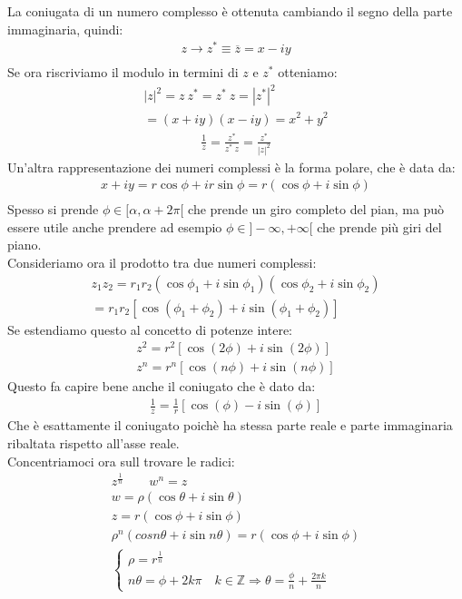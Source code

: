 \documentclass[a4paper, oneside]{article}
\begin{document}
    La coniugata di un numero complesso è ottenuta cambiando il segno della parte immaginaria, quindi:
    \begin{gather*}
        z \to z^* \equiv \overline{z} = x - iy\\
    \end{gather*}
    Se ora riscriviamo il modulo in termini di $z$ e $z^*$ otteniamo:
    \begin{gather*}
        |z|^2 = z \ z^* = z^* \ z = |z^*|^2\\
        = (x + iy)(x - iy) = x^2 + y^2
    \end{gather*}
    \begin{gather*}
        \frac{1}{z} = \frac{z^*}{z^* \ z} = \frac{z^*}{|z|^2}
    \end{gather*}
    Un'altra rappresentazione dei numeri complessi è la forma polare, che è data da:
    \begin{gather*}
        x + i y = r \cos \phi + i r \sin \phi = r (\cos \phi + i \sin \phi)\\
    \end{gather*}
    Spesso si prende $\phi \in [\alpha, \alpha+ 2\pi[$ che prende un giro completo del pian, ma può essere utile anche prendere ad esempio $\phi \in ]-\infty, +\infty[$ che prende più giri del piano.\\
    Consideriamo ora il prodotto tra due numeri complessi:
    \begin{gather*}
        z_1 z_2 = r_1 r_2 (\cos \phi_1 + i \sin \phi_1)(\cos \phi_2 + i \sin \phi_2)\\
        = r_1 r_2 [\cos (\phi_1 + \phi_2) + i \sin (\phi_1 + \phi_2)]
    \end{gather*}
    Se estendiamo questo al concetto di potenze intere:
    \begin{gather*}
        z^2 = r^2 [\cos (2\phi) + i \sin (2\phi)]\\
        z^n = r^n [\cos (n\phi) + i \sin (n\phi)]
    \end{gather*}
    Questo fa capire bene anche il coniugato che è dato da:
    \begin{gather*}
        \frac{1}{z} = \frac{1}{r} [\cos (\phi) - i \sin (\phi)]
    \end{gather*}
    Che è esattamente il coniugato poichè ha stessa parte reale e parte immaginaria ribaltata rispetto all'asse reale.\\
    Concentriamoci ora sull trovare le radici:
    \begin{gather*}
        z^{\frac{1}{n}} \qquad w^n = z\\
        w = \rho (\cos \theta + i \sin \theta)\\
        z = r (\cos \phi + i \sin \phi)\\
        \rho^n (cos n\theta + i \sin n\theta) = r (\cos \phi + i \sin \phi)\\
        \begin{cases}
            \rho = r^{\frac{1}{n}}\\
            n \theta = \phi + 2 k \pi \quad k \in \mathbb{Z} \Rightarrow \theta = \frac{\phi}{n} + \frac{2 \pi k}{n}
        \end{cases}
    \end{gather*}
\end{document}
